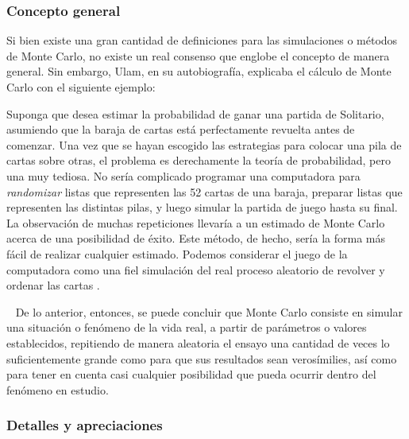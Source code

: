 \subsubsection{Concepto general} %
\noindent Si bien existe una gran cantidad de definiciones para las simulaciones o métodos de Monte Carlo, no existe un real consenso que englobe el concepto de manera general. Sin embargo, Ulam, en su autobiografía, explicaba el cálculo de Monte Carlo con el siguiente ejemplo: 

\begin{adjustwidth}{1.27cm}{}
 Suponga que desea estimar la probabilidad de ganar una partida de Solitario, asumiendo que la baraja de cartas está perfectamente revuelta antes de comenzar. Una vez  que se hayan escogido las estrategias para colocar una pila de cartas sobre otras, el  problema es derechamente la teoría de probabilidad, pero una muy tediosa. No sería  complicado programar una computadora para \textit{randomizar} listas que representen  las 52 cartas de una baraja, preparar listas que representen las distintas pilas,  y luego simular la partida de juego hasta su final. La observación de muchas  repeticiones llevaría a un estimado de Monte Carlo acerca de una posibilidad de éxito.  Este método, de hecho, sería la forma más fácil de realizar cualquier estimado.  Podemos considerar el juego de la computadora como una fiel simulación del real  proceso aleatorio de revolver y ordenar las cartas \citep{kalos2008}.
\end{adjustwidth}
~
\newline
De lo anterior, entonces, se puede concluir que Monte Carlo consiste en simular una situación o fenómeno de la vida real, a partir de parámetros o valores establecidos, repitiendo de manera aleatoria el ensayo una cantidad de veces lo suficientemente grande como para que sus resultados sean verosímilies, así como para tener en cuenta casi cualquier posibilidad que pueda ocurrir dentro del fenómeno en estudio.

\subsubsection{Detalles y apreciaciones} %

